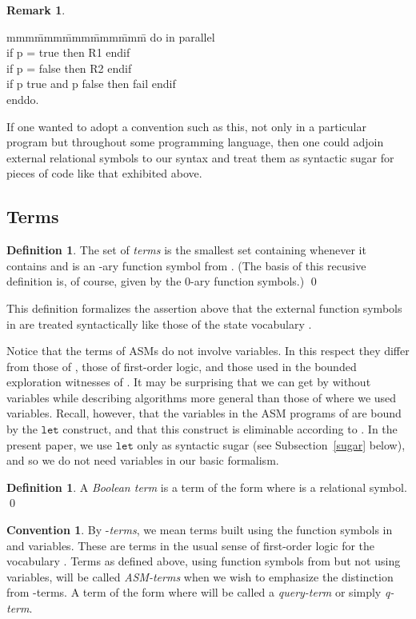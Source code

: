 \documentclass{LMCS}
\theoremstyle{definition}
\newtheorem{df}[thm]{Definition}
\newtheorem{rmk}[thm]{Remark}
\newtheorem{conn}[thm]{Convention}
\newenvironment{eatab}
 {\bigskip\noindent\begin{minipage}{\textwidth}\upshape\ttfamily
  \begin{tabbing}mmm\=mmm\=mmm\=mmm\=mmm\=\kill}
 {\end{tabbing}\end{minipage}\bigskip}
\newcommand{\ttt}[1]{\ensuremath{\mathtt {#1}}}
\begin{document}
\begin{rmk}
  \begin{eatab}
     do in parallel\\
     \> if p = true then R1 endif\\
     \> if p = false then R2 endif\\
     \> if p  true and p  false then fail endif\\
     enddo.  \end{eatab}

If one wanted to adopt a convention such as this, not only in a
particular program but throughout some programming language, then
one could adjoin external relational symbols to our syntax and treat
them as syntactic sugar for pieces of code like that exhibited above.  
\end{rmk}

\subsection{Terms}

\begin{df}
  The set of \emph{terms} is the smallest set containing
   whenever it contains  and  is
  an -ary function symbol from .  (The basis of
  this recusive definition is, of course, given by the 0-ary function
  symbols.)
\qed\end{df}

This definition formalizes the assertion above that the external
function symbols in  are treated syntactically like those of the
state vocabulary .

Notice that the terms of ASMs do not involve variables.  In this
respect they differ from those of \cite{oa2}, those of first-order
logic, and those used in the bounded exploration witnesses of
\cite{ga1}. It may be surprising that we can get by without
variables while describing algorithms more general than those of
\cite{oa2} where we used variables.  Recall, however, that the
variables in the ASM programs of \cite{oa2} are bound by the
\ttt{let} construct, and that this construct is eliminable according
to \cite[Section~7]{oa3}.  In the present paper, we use \ttt{let}
only as syntactic sugar (see Subsection~\ref{sugar} below), and so
we do not need variables in our basic formalism.

\begin{df}
  A \emph{Boolean term} is a term of the form  where  is
  a relational symbol.
\qed\end{df}

\begin{conn}
  By -\emph{terms}, we mean terms built using the function
  symbols in  and variables.  These are terms in the usual
  sense of first-order logic for the vocabulary .  Terms as
  defined above, using function symbols from  but not
  using variables, will be called \emph{ASM-terms} when we wish to
  emphasize the distinction from -terms.  A term of the form
   where  will be called a \emph{query-term} or
  simply \emph{q-term}.
\end{conn}
\end{document}
